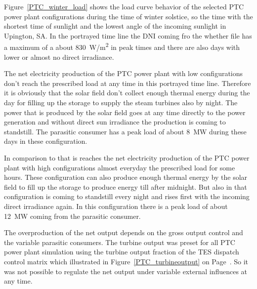Figure~\ref{PTC_winter_load} shows the load curve behavior of the selected PTC power plant configurations during the time of winter solstice, so the time with the shortest time of sunlight and the lowest angle of the incoming sunlight in Upington, SA. In the portrayed time line the DNI coming fro the whether file has a maximum of a about 830~W/m\textsuperscript{2} in peak times and there are also days with lower or almost no direct irradiance. 

The net electricity production of the PTC power plant with low configurations don't reach the prescribed load at any time in this portrayed time line. Therefore it is obviously that the solar field don't collect enough thermal energy during the day for filling up the storage to supply the steam turbines also by night. The power that is produced by the solar field goes at any time directly to the power generation and without direct sun irradiance the production is coming to standstill. The parasitic consumer has a peak load of about 8~MW during these days in these configuration.

In comparison to that is reaches the net electricity production of the PTC power plant with high configurations almost everyday the prescribed load for some hours. These configuration can also produce enough thermal energy by the solar field to fill up the storage to produce energy till after midnight. But also in that configuration is coming to standstill every night and rises first with the incoming direct irradiance again. In this configuration there is a peak load of about 12~MW coming from the parasitic consumer. 

The overproduction of the net output depends on the gross output control and the variable parasitic consumers. The turbine output was preset for all PTC power plant simulation using the turbine output fraction of the TES dispatch control matrix which illustrated in Figure~\ref{PTC_turbineoutput} on Page~\pageref{PTC_turbineoutput}. So it was not possible to regulate the net output under variable external influences at any time. 

